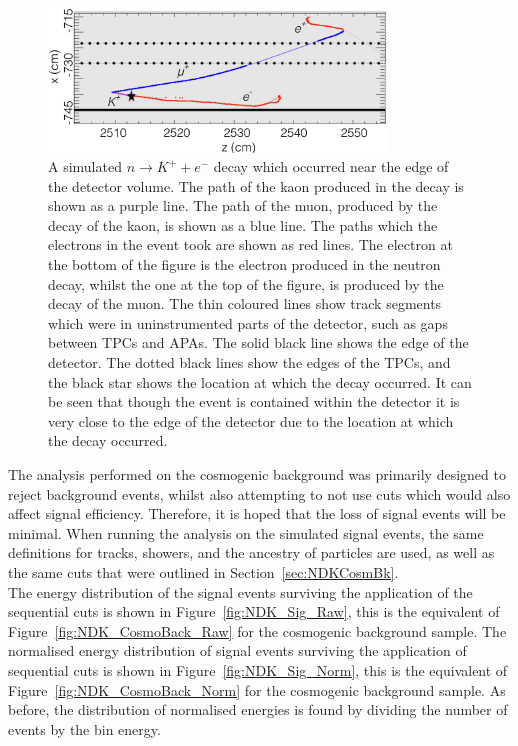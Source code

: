 \begin{figure}[h!]
  \centering
  \includegraphics[width=0.8\textwidth]{KaonElecNearEdge}
  \caption[A simulated $n \rightarrow K^{+} + e^{-}$ decay which occurred near the edge of the detector volume]
          {A simulated $n \rightarrow K^{+} + e^{-}$ decay which occurred near the edge of the detector volume. The path of the kaon produced in the decay is shown as a purple line. The path of the muon, produced by the decay of the kaon, is shown as a blue line. The paths which the electrons in the event took are shown as red lines. The electron at the bottom of the figure is the electron produced in the neutron decay, whilst the one at the top of the figure, is produced by the decay of the muon. The thin coloured lines show track segments which were in uninstrumented parts of the detector, such as gaps between TPCs and APAs. The solid black line shows the edge of the detector. The dotted black lines show the edges of the TPCs, and the black star shows the location at which the decay occurred. It can be seen that though the event is contained within the detector it is very close to the edge of the detector due to the location at which the decay occurred.}
  \label{fig:NDK_Sig_KENearEdge}
\end{figure}

The analysis performed on the cosmogenic background was primarily designed to reject background events, whilst also attempting to not use cuts which would also affect signal efficiency. Therefore, it is hoped that the loss of signal events will be minimal. When running the analysis on the simulated signal events, the same definitions for tracks, showers, and the ancestry of particles are used, as well as the same cuts that were outlined in Section~\ref{sec:NDKCosmBk}. \\

The energy distribution of the signal events surviving the application of the sequential cuts is shown in Figure~\ref{fig:NDK_Sig_Raw}, this is the equivalent of Figure~\ref{fig:NDK_CosmoBack_Raw} for the cosmogenic background sample. The normalised energy distribution of signal events surviving the application of sequential cuts is shown in Figure~\ref{fig:NDK_Sig_Norm}, this is the equivalent of Figure~\ref{fig:NDK_CosmoBack_Norm} for the cosmogenic background sample. As before, the distribution of normalised energies is found by dividing the number of events by the bin energy. \\

